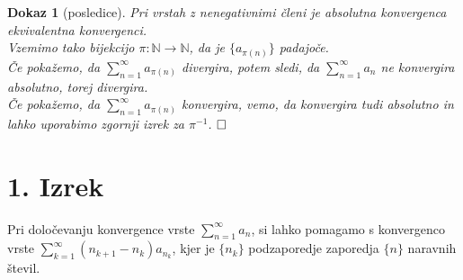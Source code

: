 \documentclass{beamer}
\def\qed{$\hfill\Box$}   %
\newtheorem{dokaz}{Dokaz}
\def\N{\mathbb{N}} %
\begin{document}
\begin{frame}
    \begin{dokaz}[posledice]
        Pri vrstah z nenegativnimi členi je absolutna konvergenca ekvivalentna konvergenci.\\
        \pause
        Vzemimo tako bijekcijo $\pi: \N \rightarrow \N$, da je $\{a_{\pi(n)}\}$ padajoče.\\
        \pause
        Če pokažemo, da $\sum_{n = 1}^{\infty}{a_{\pi(n)}}$ divergira, potem sledi, da $\sum_{n = 1}^{\infty}{a_n}$ ne konvergira absolutno, torej divergira.\\
        \pause
        Če pokažemo, da $\sum_{n = 1}^{\infty}{a_{\pi(n)}}$ konvergira, vemo, da konvergira tudi absolutno in lahko uporabimo zgornji izrek za $\pi^{-1}$.
        \qed
    \end{dokaz}
    
\end{frame}

\section{1. Izrek}

\begin{frame}
    Pri določevanju konvergence vrste $\sum_{n = 1}^{\infty}{a_n}$, si lahko pomagamo s konvergenco vrste
    $\sum_{k = 1}^{\infty}{(n_{k+1} - n_k)a_{n_{k}}}$, kjer je $\{n_k\}$ podzaporedje zaporedja $\{n\}$ naravnih števil.    
\end{frame}
\end{document}
